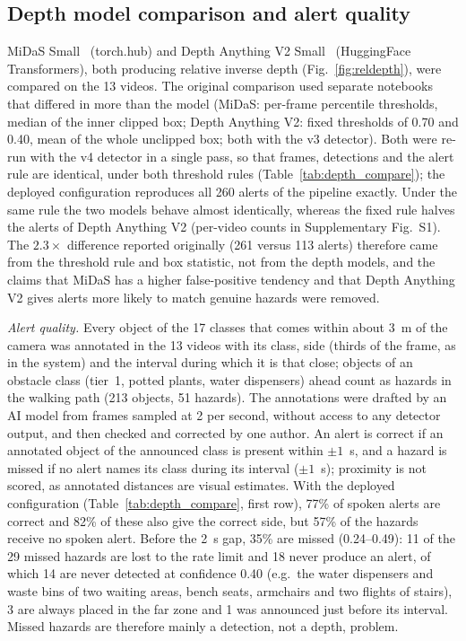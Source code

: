 \documentclass[3p,times,procedia]{elsarticle}
\DeclareRobustCommand{\rev}[1]{{\hlattr=1 #1}}
\DeclareRobustCommand{\rev}[1]{\hl{#1}}
\DeclareRobustCommand{\rev}[1]{#1}
\begin{document}
\subsection{Depth model comparison and alert quality}
\label{sec:depth}

MiDaS Small~\cite{ranftl2020midas} (torch.hub) and Depth Anything
V2 Small~\cite{depthanythingv2} (HuggingFace Transformers), both producing relative inverse depth (Fig.~\ref{fig:reldepth}), were
compared on the 13 videos. The original comparison used separate notebooks
that differed in more than the model (MiDaS: per-frame percentile
thresholds, median of the inner clipped box; Depth Anything V2: fixed
thresholds of 0.70 and 0.40, mean of the whole unclipped box; both with the
v3 detector). \rev{Both were re-run with the v4 detector in a single pass, so
that frames, detections and the alert rule are identical, under both
threshold rules} (Table~\ref{tab:depth_compare}); \rev{the deployed configuration
reproduces all 260 alerts of the pipeline exactly}. \rev{Under the same rule the
two models behave almost identically, whereas the fixed rule halves the
alerts of Depth Anything V2} (per-video counts in Supplementary Fig.~S1). The
\rev{$2.3\times$ difference reported originally (261 versus 113 alerts) therefore
came from the threshold rule and box statistic, not from the depth models},
and \rev{the claims that MiDaS has a higher false-positive tendency and that
Depth Anything V2 gives alerts more likely to match genuine hazards were
removed.}

\emph{Alert quality.} \rev{Every object of the 17 classes that comes within about
3~m of the camera was annotated in the 13 videos} with its class, side
(thirds of the frame, as in the system) and the interval during which it is
that close; objects of an obstacle class (tier~1, potted plants, water
dispensers) ahead count as hazards in the walking path (213 objects, 51
hazards). The annotations were drafted by an AI model from frames sampled at
2 per second, without access to any detector output, and then checked and
corrected by one author. \rev{An alert is correct if an annotated object of the
announced class is present within $\pm 1$~s, and a hazard is missed if no
alert names its class during its interval ($\pm 1$~s)}; proximity is not
scored, as annotated distances are visual estimates. With the deployed
configuration (Table~\ref{tab:depth_compare}, first row), \rev{77\% of spoken
alerts are correct and 82\% of these also give the correct side, but 57\%
of the hazards receive no spoken alert.} Before the 2~s gap, 35\% are missed
(0.24--0.49): 11 of the 29 missed hazards are lost to the rate limit and 18
never produce an alert, of which 14 are never detected at confidence 0.40
(e.g.~the water dispensers and waste bins of two waiting areas, bench
seats, armchairs and two flights of stairs), 3 are always placed in the far
zone and 1 was announced just before its interval. \rev{Missed hazards are
therefore mainly a detection, not a depth, problem.}
\end{document}

